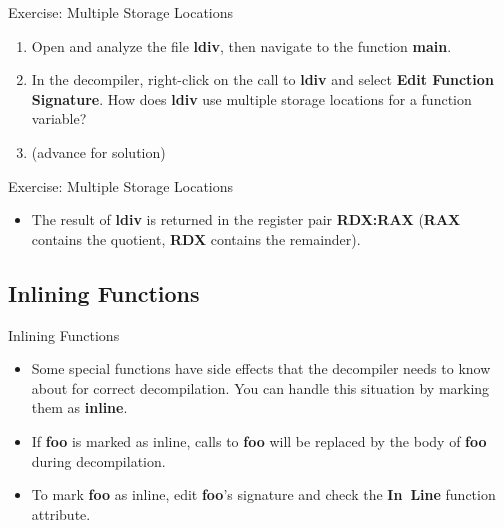 \documentclass{beamer}
\begin{document}
\begin{frame}
\begin{block}{Exercise: Multiple Storage Locations}
\begin{enumerate}
\item Open and analyze the file \textbf{ldiv}, then navigate to the function \textbf{main}.
\item In the decompiler, right-click on the call to \textbf{ldiv} and select \textbf{Edit Function Signature}.  How does \textbf{ldiv} use multiple storage locations for a function variable?\item[] (advance for solution)
\end{enumerate}
\end{block}
\end{frame}

\begin{frame}
\begin{block}{Exercise: Multiple Storage Locations}
\begin{itemize}
\item The result of \textbf{ldiv} is returned in the register pair \textbf{RDX:RAX} (\textbf{RAX} contains the quotient, \textbf{RDX} contains the remainder). 
\end{itemize}
\end{block}
\end{frame}

\subsection{Inlining Functions}

\begin{frame}
\begin{block}{Inlining Functions}
\begin{itemize}
\item Some special functions have side effects that the decompiler needs to know about for correct decompilation. You can handle this situation by marking them
as \textbf{inline}. 
\item If \textbf{foo} is marked as inline, calls to \textbf{foo} will be replaced by the body of \textbf{foo} during decompilation.
\item To mark \textbf{foo} as inline, edit \textbf{foo}'s signature and check the \textbf{In~Line} function attribute.
\end{itemize}
\end{block}
\end{frame}
\end{document}
